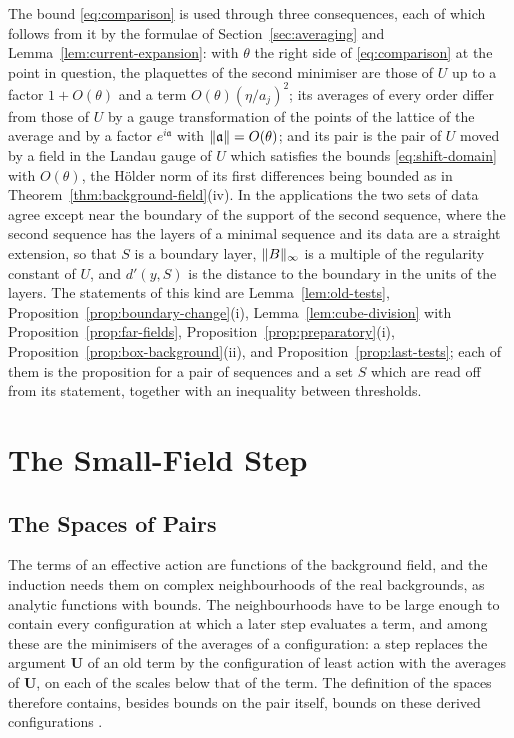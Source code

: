\documentclass[11pt]{preprint}
\DeclarePairedDelimiter{\norm}{\lVert}{\rVert}
\numberwithin{equation}{section}
\begin{document}
The bound \eqref{eq:comparison} is used through three consequences, each of which follows from it by the formulae of Section~\ref{sec:averaging} and Lemma~\ref{lem:current-expansion}: with $\theta$ the right side of \eqref{eq:comparison} at the point in question, the plaquettes of the second minimiser are those of $U$ up to a factor $1 + O(\theta)$ and a term $O(\theta)(\eta/a_j)^2$; its averages of every order differ from those of $U$ by a gauge transformation of the points of the lattice of the average and by a factor $e^{i\mathfrak a}$ with $\norm{\mathfrak a} = O(\theta)$; and its pair is the pair of $U$ moved by a field in the Landau gauge of $U$ which satisfies the bounds \eqref{eq:shift-domain} with $O(\theta)$, the H\"older norm of its first differences being bounded as in Theorem~\ref{thm:background-field}(iv). In the applications the two sets of data agree except near the boundary of the support of the second sequence, where the second sequence has the layers of a minimal sequence and its data are a straight extension, so that $S$ is a boundary layer, $\norm B_\infty$ is a multiple of the regularity constant of $U$, and $d'(y, S)$ is the distance to the boundary in the units of the layers. The statements of this kind are Lemma~\ref{lem:old-tests}, Proposition~\ref{prop:boundary-change}(i), Lemma~\ref{lem:cube-division} with Proposition~\ref{prop:far-fields}, Proposition~\ref{prop:preparatory}(i), Proposition~\ref{prop:box-background}(ii), and Proposition~\ref{prop:last-tests}; each of them is the proposition for a pair of sequences and a set $S$ which are read off from its statement, together with an inequality between thresholds.

\section{The Small-Field Step}\label{sec:small-field}

\subsection{The Spaces of Pairs}\label{sec:pair-spaces}

The terms of an effective action are functions of the background field, and the induction needs them on complex neighbourhoods of the real backgrounds, as analytic functions with bounds. The neighbourhoods have to be large enough to contain every configuration at which a later step evaluates a term, and among these are the minimisers of the averages of a configuration: a step replaces the argument $\mathbf U$ of an old term by the configuration of least action with the averages of $\mathbf U$, on each of the scales below that of the term. The definition of the spaces therefore contains, besides bounds on the pair itself, bounds on these derived configurations \cite[Definition, p.~262]{BalabanRG1}.
\end{document}
